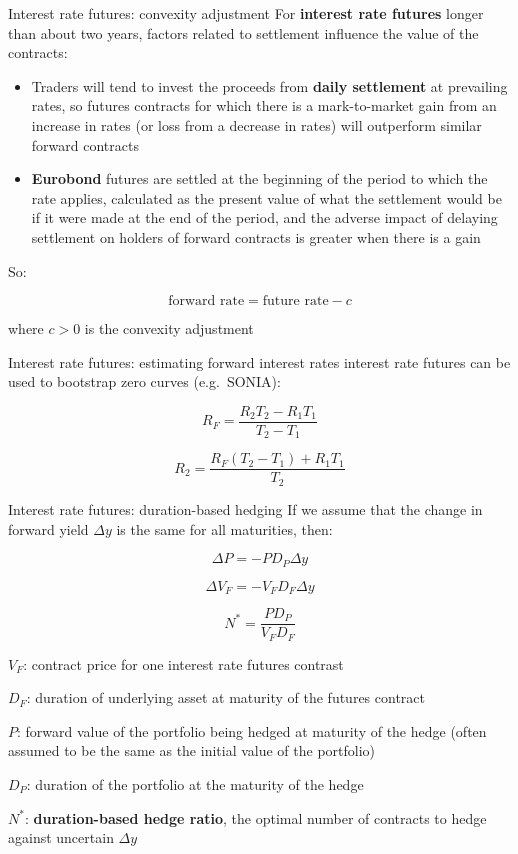 \documentclass[
  ignorenonframetext,
  aspectratio=169]{beamer}
\providecommand{\tightlist}{%
  \setlength{\itemsep}{0pt}\setlength{\parskip}{0pt}}
\begin{document}
\begin{frame}{Interest rate futures: convexity adjustment}
\protect\hypertarget{interest-rate-futures-convexity-adjustment}{}
For \textbf{interest rate futures} longer than about two years, factors
related to settlement influence the value of the contracts:

\begin{itemize}
\tightlist
\item
  Traders will tend to invest the proceeds from \textbf{daily
  settlement} at prevailing rates, so futures contracts for which there
  is a mark-to-market gain from an increase in rates (or loss from a
  decrease in rates) will outperform similar forward contracts
\item
  \textbf{Eurobond} futures are settled at the beginning of the period
  to which the rate applies, calculated as the present value of what the
  settlement would be if it were made at the end of the period, and the
  adverse impact of delaying settlement on holders of forward contracts
  is greater when there is a gain
\end{itemize}

So:

\[\text{forward rate} =  \text{future rate} - c\]

where \(c > 0\) is the convexity adjustment
\end{frame}

\begin{frame}{Interest rate futures: estimating forward interest rates}
\protect\hypertarget{interest-rate-futures-estimating-forward-interest-rates}{}
interest rate futures can be used to bootstrap zero curves (e.g.~SONIA):

\[
R_F = \frac{R_2T_2 - R_1T_1}{T_2 - T_1}
\]

\[
R_2 = \frac{R_F (T_2 - T_1) + R_1 T_1}{T_2}
\]
\end{frame}

\begin{frame}{Interest rate futures: duration-based hedging}
\protect\hypertarget{interest-rate-futures-duration-based-hedging}{}
If we assume that the change in forward yield \(\Delta y\) is the same
for all maturities, then:

\[
\Delta P = -PD_P\Delta y
\]

\[
\Delta V_F = -V_F D_F \Delta y
\]

\[
N^* = \frac{P D_P}{V_F D_F}
\]

\(V_F\): contract price for one interest rate futures contrast

\(D_F\): duration of underlying asset at maturity of the futures
contract

\(P\): forward value of the portfolio being hedged at maturity of the
hedge (often assumed to be the same as the initial value of the
portfolio)

\(D_P\): duration of the portfolio at the maturity of the hedge

\(N^*\): \textbf{duration-based hedge ratio}, the optimal number of
contracts to hedge against uncertain \(\Delta y\)
\end{frame}
\end{document}
